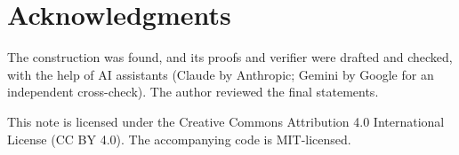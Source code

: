 \documentclass[11pt,a4paper]{article}
\theoremstyle{remark}
\begin{document}
\section*{Acknowledgments}
The construction was found, and its proofs and verifier were drafted and checked, with the help of AI assistants (Claude by Anthropic; Gemini by Google for an independent cross-check). The author reviewed the final statements.



\vfill
\noindent\small This note is licensed under the Creative Commons Attribution 4.0 International License (CC BY 4.0). The accompanying code is MIT-licensed.
\end{document}
